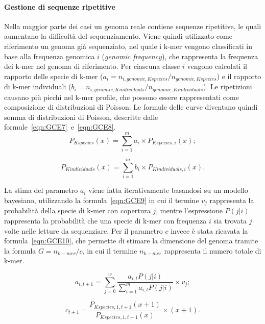 \documentclass[crop=false, class=book]{standalone}
\begin{document}
	\paragraph{Gestione di sequenze ripetitive}
	Nella maggior parte dei casi un genoma reale contiene sequenze ripetitive, le quali aumentano la difficoltà del sequenziamento. Viene quindi utilizzato come riferimento un genoma già sequenziato, nel quale i k-mer vengono classificati in base alla frequenza genomica $i$ (\textit{genomic frequency}), che rappresenta la frequenza dei k-mer nel genoma di riferimento. Per ciascuna classe $i$ vengono calcolati il rapporto delle specie di k-mer ($a_i = n_{i, genomic, Kspecies} / n_{genomic, Kspecies}$) e il rapporto di k-mer individuali ($b_i = n_{i, genomic, Kindividuals} / n_{genomic, Kindividuals}$). 
	Le ripetizioni causano più picchi nel k-mer profile, che possono essere rappresentati come composizione di distribuzioni di Poisson. Le formule delle curve diventano quindi somma di distribuzioni di Poisson, descritte dalle formule~\vref{eqn:GCE7}~e~\vref{eqn:GCE8}.
	\begin{equation}
		\label{eqn:GCE7}
		P_{Kspecies}(x) = \sum_{i=1}^{m} a_i \times P_{Kspecies, i}(x);
	\end{equation}
	
	\begin{equation}
		\label{eqn:GCE8}
		P_{Kindividuals}(x) = \sum_{i=1}^{m} b_i \times P_{Kindividuals, i}(x).
	\end{equation}
	
	La stima del parametro $a_i$ viene fatta iterativamente basandosi su un modello bayesiano, utilizzando la formula~\vref{eqn:GCE9} in cui il termine $v_j$ rappresenta la probabilità della specie di k-mer con copertura $j$, mentre l'espressione $P(j|i)$ rappresenta la probabilità che una specie di k-mer con frequenza $i$ sia trovata $j$ volte nelle letture da sequenziare. Per il parametro $c$ invece è stata ricavata la formula~\vref{eqn:GCE10}, che permette di stimare la dimensione del genoma tramite la formula $G = n_{k-mer}/c$, in cui il termine $ n_{k-mer}$ rappresenta il numero totale di k-mer.
	
	\begin{equation}
		\label{eqn:GCE9}
		a_{i,t+1} = \sum_{j=0}^{w} \frac{a_{i,t} P(j|i)}{\sum_{i=1}^{m} a_{i,t} P(j|i)} \times v_j;
	\end{equation}

	\begin{equation}
		\label{eqn:GCE10}
		c_{t+1} = \frac{P_{Kspecies, 1, t+1}(x+1)}{P_{Kspecies, 1, t+1}(x)} \times (x+1).
	\end{equation}
	
\end{document}
